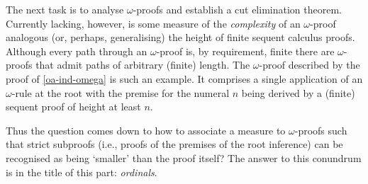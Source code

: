 The next task is to analyse \( ω \)-proofs and establish a cut elimination theorem.
Currently lacking, however, is some measure of the \emph{complexity} of an \( ω \)-proof analogous (or, perhaps, generalising) the height of finite sequent calculus proofs.
Although every path through an \( ω \)-proof is, by requirement, finite there are \( ω \)-proofs that admit paths of arbitrary (finite) length.
The \( ω \)-proof described by the proof of \cref{oa-ind-omega} is such an example.
It comprises a single application of an \( ω \)-rule at the root with the premise for the numeral \( n \) being derived by a (finite) sequent proof of height at least \( n \).

Thus the question comes down to how to associate a measure to \( ω \)-proofs such that strict subproofs (i.e., proofs of the premises of the root inference) can be recognised as being ‘smaller’ than the proof itself?
The answer to this conundrum is in the title of this part: \emph{ordinals}.



